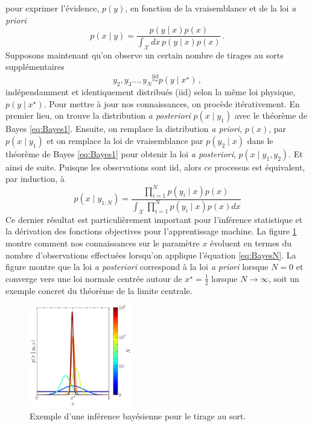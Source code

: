 pour exprimer l'évidence, $p(y)$, en fonction de la vraisemblance et de la loi \textit{a priori} 
\begin{equation}
        p(x \mid y) = \frac{p(y \mid x) p(x)}{\int_\mathcal{X} dx\, p(y \mid x) p(x)} \, .
\end{equation} 
Supposons maintenant qu'on observe un certain nombre de tirages au sorts supplémentaires
\begin{equation*}
        y_2,y_3\dots,y_N \overset{\mathrm{iid}}{\sim} p(y \mid x^{\star})\, ,
\end{equation*}
indépendamment et identiquement distribués (iid) selon la même loi physique, $p(y \mid x^{\star})$. Pour mettre à jour nos connaissances, on procède 
itérativement. En premier lieu, on trouve la distribution \textit{a posteriori} $p(x \mid y_1)$ avec le théorème de Bayes \eqref{eq:Bayes1}. Ensuite, 
on remplace la distribution \textit{a priori}, $p(x)$, par $p(x \mid y_1)$ et on remplace la loi de vraisemblance par $p(y_2 \mid x)$ dans le théorème de Bayes \eqref{eq:Bayes1} 
pour obtenir la loi \textit{a posteriori}, $p(x \mid y_1, y_2)$. Et ainsi de suite.
Puisque les observations sont iid, alors ce processus est équivalent, par induction, à 
\begin{equation}\label{eq:BayesN}
        p(x \mid y_{1:N}) = \frac{\prod_{i=1}^{N} p(y_i \mid x) p(x)}{\int_\mathcal{X} \prod_{i=1}^{N}p(y_{i} \mid x) p(x) dx}
\end{equation} 
Ce dernier résultat est particulièrement important pour l'inférence statistique et la dérivation des fonctions 
objectives pour l'apprentissage machine. La figure \ref{fig:bayes update} montre comment nos connaissances 
sur le paramètre $x$ évoluent en termes du nombre d'observations effectuées lorsqu'on applique l'équation \eqref{eq:BayesN}. 
La figure montre que la loi \textit{a posteriori} correspond à la loi \textit{a priori} lorsque $N = 0$ 
et converge vers une loi normale centrée autour de $x^{\star}=\frac{1}{2}$ lorsque $N \rightarrow \infty$, 
soit un exemple concret du théorème de la limite centrale.
\begin{figure}[H]
        \centering
        \includegraphics[width=0.4\textwidth]{notebooks/toy_coin_toss.pdf}
        \caption{Exemple d'une inférence bayésienne pour le tirage au sort.}
        \label{fig:bayes update}
\end{figure}

